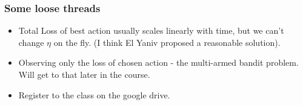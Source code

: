 \documentclass{beamer}
\begin{document}
\begin{frame}
\frametitle{Some loose threads}
\begin{itemize}
\item Total Loss of best action usually scales linearly with time, but we can't change 
$\eta$ on the fly. (I think El Yaniv proposed a reasonable solution).
\item Observing only the loss of chosen action - the multi-armed
  bandit problem. Will get to that later in the course.
\item Register to the class on the google drive.
\end{itemize}
\end{frame}
\end{document}
